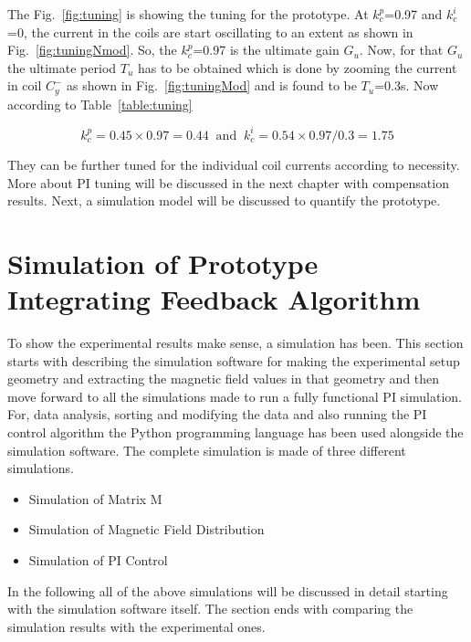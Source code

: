 The Fig.~\ref{fig:tuning} is showing the tuning for the prototype. At $k_c^p$=0.97 and $k_c^i$=0, the current in the coils are start oscillating to an extent as shown in Fig.~\ref{fig:tuningNmod}. So, the $k_c^p$=0.97 is the ultimate gain $G_u$. Now, for that $G_u$ the ultimate period $T_u$ has to be obtained which is done by zooming the current in coil $C_y^-$ as shown in Fig.~\ref{fig:tuningMod} and is found to be $T_u$=0.3s. Now according to Table~\ref{table:tuning}

\begin{equation}
    k_c^p=0.45\times0.97=0.44\;\;\text{and}\;\; k_c^i=0.54\times0.97/0.3=1.75
\end{equation}


They can be further tuned for the individual coil currents according to necessity. More about PI tuning will be discussed in the next chapter with compensation results. Next, a simulation model will be discussed to quantify the prototype.



 
 
% 

\FloatBarrier
\section{Simulation of Prototype Integrating Feedback Algorithm}

To show the experimental results make sense, a simulation has been. This section starts with describing the simulation software for making the experimental setup geometry and extracting the magnetic field values in that geometry and then move forward to all the simulations made to run a fully functional PI simulation. For, data analysis, sorting  and modifying the data and also running the PI control algorithm the Python programming language has been used alongside the simulation software. The complete simulation is made of three different simulations. 

\begin{itemize}
    \item Simulation of Matrix M
    \item Simulation of Magnetic Field Distribution
    \item Simulation of PI Control
\end{itemize}
In the following  all of the above simulations  will be discussed in detail starting with the simulation software itself. The section ends with comparing the simulation results with the experimental ones.

